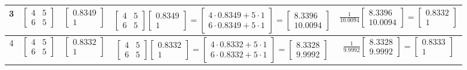 \documentclass[12pt]{article}
\begin{document}
\begin{adjustwidth}{-1.7cm}{}
\begin{tabular}{|c|c|c|c|c|}
        3 & $\begin{bmatrix} 4 & 5 \\ 6 & 5 \end{bmatrix}$ & $\begin{bmatrix} 0.8349 \\ 1 \end{bmatrix}$ & 
        $\begin{bmatrix} 4 & 5 \\ 6 & 5 \end{bmatrix} \begin{bmatrix} 0.8349 \\ 1 \end{bmatrix} = \begin{bmatrix} 4 \cdot 0.8349 + 5 \cdot 1 \\ 6 \cdot 0.8349 + 5 \cdot 1 \end{bmatrix} = \begin{bmatrix} 8.3396 \\ 10.0094 \end{bmatrix}$ &
        $\frac{1}{10.0094} \begin{bmatrix} 8.3396 \\ 10.0094 \end{bmatrix} = \begin{bmatrix} 0.8332 \\ 1 \end{bmatrix}$ \\ \hline
        
        4 & $\begin{bmatrix} 4 & 5 \\ 6 & 5 \end{bmatrix}$ & $\begin{bmatrix} 0.8332 \\ 1 \end{bmatrix}$ & 
        $\begin{bmatrix} 4 & 5 \\ 6 & 5 \end{bmatrix} \begin{bmatrix} 0.8332 \\ 1 \end{bmatrix} = \begin{bmatrix} 4 \cdot 0.8332 + 5 \cdot 1 \\ 6 \cdot 0.8332 + 5 \cdot 1 \end{bmatrix} = \begin{bmatrix} 8.3328 \\ 9.9992 \end{bmatrix}$ &
        $\frac{1}{9.9992} \begin{bmatrix} 8.3328 \\ 9.9992 \end{bmatrix} = \begin{bmatrix} 0.8333 \\ 1 \end{bmatrix}$ \\ \hline
        
    \end{tabular}
\end{adjustwidth}
\end{document}
